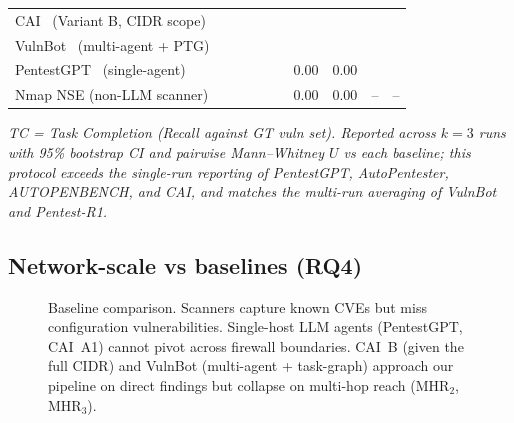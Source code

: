 \begin{table}[t]
\begin{tabular}{@{}lrrrrrrrrr@{}}
CAI~\cite{cai25} (Variant B, CIDR scope)        & \todo{} & \todo{} & \todo{} & \todo{} & \todo{} & \todo{} & \todo{} & \todo{} & \todo{} \\
VulnBot~\cite{vulnbot25} (multi-agent + PTG)    & \todo{} & \todo{} & \todo{} & \todo{} & \todo{} & \todo{} & \todo{} & \todo{} & \todo{} \\
PentestGPT~\cite{pentestgpt24} (single-agent)   & \todo{} & \todo{} & \todo{} & \todo{} & \todo{} & 0.00    & 0.00    & \todo{} & \todo{} \\
\midrule
Nmap NSE (non-LLM scanner)                      & \todo{} & \todo{} & \todo{} & \todo{} & \todo{} & 0.00    & 0.00    & --      & --     \\
\bottomrule
\end{tabular}

\smallskip
\footnotesize\emph{TC = Task Completion (Recall against GT vuln set).
Reported across $k{=}3$ runs with 95\% bootstrap CI and pairwise Mann--Whitney
$U$ vs each baseline; this protocol exceeds the single-run reporting of
PentestGPT, AutoPentester, AUTOPENBENCH, and CAI, and matches the multi-run
averaging of VulnBot and Pentest-R1.}
\end{table}


\subsection{Network-scale vs baselines (RQ4)}
\label{sec:eval:baselines}

\begin{figure}[t]
  \centering
  \caption{Baseline comparison. Scanners capture known CVEs but miss
  configuration vulnerabilities. Single-host LLM agents (PentestGPT, CAI~A1)
  cannot pivot across firewall boundaries. CAI~B (given the full CIDR) and
  VulnBot (multi-agent + task-graph) approach our pipeline on direct findings
  but collapse on multi-hop reach (MHR$_2$, MHR$_3$).}
  \label{fig:baselines}
\end{figure}

